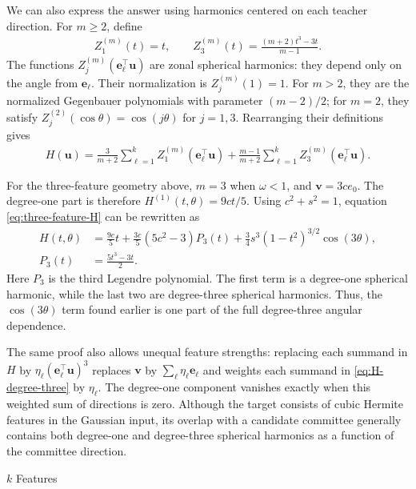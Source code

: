 \documentclass[11pt, reqno]{amsart}
\makeatletter
\def\section{\@startsection{section}{1}%
  \z@{.7\linespacing\@plus\linespacing}{.5\linespacing}%
  {\normalfont\scshape\centering}}
\theoremstyle{notestyle}
\theoremstyle{defstyle}
\makeatother
\begin{document}
We can also express the answer using harmonics centered on each teacher direction.
For $m\geq2$, define
\begin{align*}
    Z_1^{(m)}(t)=t,
    \qquad Z_3^{(m)}(t)=\frac{(m+2)t^3-3t}{m-1}.
\end{align*}
The functions $Z_j^{(m)}(\mathbf e_\ell^\top\mathbf u)$ are zonal spherical harmonics: they depend only on the angle from $\mathbf e_\ell$.
Their normalization is $Z_j^{(m)}(1)=1$.
For $m>2$, they are the normalized Gegenbauer polynomials with parameter $(m-2)/2$; for $m=2$, they satisfy $Z_j^{(2)}(\cos\theta)=\cos(j\theta)$ for $j=1,3$.
Rearranging their definitions gives
\begin{align}
    H(\mathbf u)
    = \frac{3}{m+2}\sum_{\ell=1}^k Z_1^{(m)}(\mathbf e_\ell^\top\mathbf u)
    +\frac{m-1}{m+2}\sum_{\ell=1}^k Z_3^{(m)}(\mathbf e_\ell^\top\mathbf u).
    \label{eq:H-zonal-harmonics}
\end{align}

For the three-feature geometry above, $m=3$ when $\omega<1$, and $\mathbf v=3ce_0$.
The degree-one part is therefore $H^{(1)}(t,\theta)=9ct/5$.
Using $c^2+s^2=1$, equation \eqref{eq:three-feature-H} can be rewritten as
\begin{align*}
    H(t,\theta)
    &= \frac{9c}{5}t
    +\frac{3c}{5}(5c^2-3)P_3(t)
    +\frac{3}{4}s^3(1-t^2)^{3/2}\cos(3\theta), \\
    P_3(t)&=\frac{5t^3-3t}{2}.
\end{align*}
Here $P_3$ is the third Legendre polynomial.
The first term is a degree-one spherical harmonic, while the last two are degree-three spherical harmonics.
Thus, the $\cos(3\theta)$ term found earlier is one part of the full degree-three angular dependence.

The same proof also allows unequal feature strengths: replacing each summand in $H$ by $\eta_\ell(\mathbf e_\ell^\top\mathbf u)^3$ replaces $\mathbf v$ by $\sum_\ell\eta_\ell\mathbf e_\ell$ and weights each summand in \eqref{eq:H-degree-three} by $\eta_\ell$.
The degree-one component vanishes exactly when this weighted sum of directions is zero.
Although the target consists of cubic Hermite features in the Gaussian input, its overlap with a candidate committee generally contains both degree-one and degree-three spherical harmonics as a function of the committee direction.

\section{\texorpdfstring{$k$}{k} Features}
\end{document}
